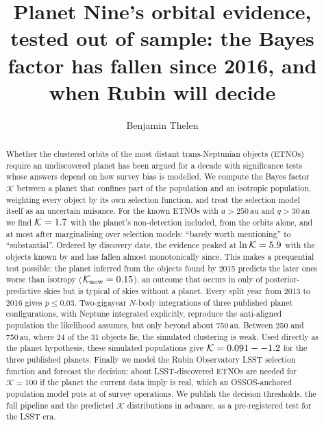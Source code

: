 \documentclass[twocolumn,linenumbers]{aastex631}
\newcommand{\Kbf}{\mathcal{K}}
\begin{document}
\title{Planet Nine's orbital evidence, tested out of sample: the Bayes factor has fallen since 2016, and when Rubin will decide}

\author[0000-0000-0000-0000]{Benjamin Thelen}

\begin{abstract}
Whether the clustered orbits of the most distant trans-Neptunian objects (ETNOs) require an undiscovered planet has been argued for a decade with significance tests whose answers depend on how survey bias is modelled.
We compute the Bayes factor $\Kbf$ between a planet that confines part of the population and an isotropic population, weighting every object by its own selection function, and treat the selection model itself as an uncertain nuisance.
For the \NbbSixteen{} known ETNOs with $a>250$\,au and $q>30$\,au we find $\Kbf=\KbbNondet$ with the planet's non-detection included, \KbbOrbits{} from the orbits alone, and at most \KselMarg{} after marginalising over selection models: ``barely worth mentioning'' to ``substantial''.
Ordered by discovery date, the evidence peaked at $\ln\Kbf=\lnKpeak$ with the objects known by \YearPeak{} and has fallen almost monotonically since.
This makes a prequential test possible: the planet inferred from the \NtrainObjects{} objects found by 2015 predicts the \NnewObjects{} later ones worse than isotropy ($\Kbf_\mathrm{new}=\KnewObjects$), an outcome that occurs in only \PnewUnderPlanet{} of posterior-predictive skies but is typical of skies without a planet. Every split year from 2013 to 2016 gives $p\le0.03$.
Two-gigayear $N$-body integrations of three published planet configurations, with Neptune integrated explicitly, reproduce the anti-aligned population the likelihood assumes, but only beyond about 750\,au. Between 250 and 750\,au, where 24 of the 31 objects lie, the simulated clustering is weak. Used directly as the planet hypothesis, these simulated populations give $\Kbf=\NbodyKrange$ for the three published planets.
Finally we model the Rubin Observatory LSST selection function and forecast the decision: about \NKhundredLSST{} LSST-discovered ETNOs are needed for $\Kbf=100$ if the planet the current data imply is real, which an OSSOS-anchored population model puts at \YieldYears{} of survey operations.
We publish the decision thresholds, the full pipeline and the predicted $\Kbf$ distributions in advance, as a pre-registered test for the LSST era.
\end{abstract}
\end{document}
